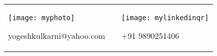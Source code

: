 \documentclass{article}
\begin{document}
\vfill

\begin{tabular}{@{}p{}@{}p{}@{}p{}@{}}
\centering
\texttt{[image: myphoto]} 

yogeshkulkarni@yahoo.com
&
& 
\centering
\texttt{[image: mylinkedinqr]}

+91 9890251406
\end{tabular}



\end{document}
